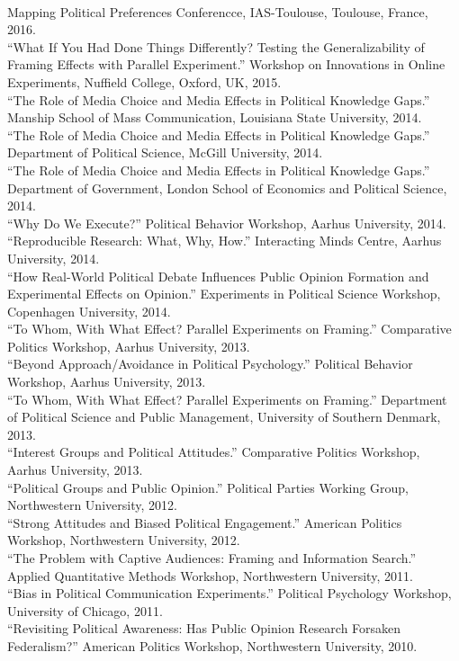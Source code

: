 \documentclass[12pt]{article}
\newcommand{\topic}[1]{\pagebreak[3]\indent {\color{lg}{\footnotesize #1 }}\\}
\newcommand{\entry}[1]{\indent {\color{lg}\guillemotright}\hspace{2pt}#1\vspace{.25em}\\}
\begin{document}
\topic{Invited Presentations}
\entry{Mapping Political Preferences Conferencce, IAS-Toulouse, Toulouse, France, 2016.}
\entry{``What If You Had Done Things Differently? Testing the Generalizability of Framing Effects with Parallel Experiment.'' Workshop on Innovations in Online Experiments, Nuffield College, Oxford, UK, 2015.}
\entry{``The Role of Media Choice and Media Effects in Political Knowledge Gaps.'' Manship School of Mass Communication, Louisiana State University, 2014.}
\entry{``The Role of Media Choice and Media Effects in Political Knowledge Gaps.'' Department of Political Science, McGill University, 2014.}
\entry{``The Role of Media Choice and Media Effects in Political Knowledge Gaps.'' Department of Government, London School of Economics and Political Science, 2014.}
\entry{``Why Do We Execute?'' Political Behavior Workshop, Aarhus University, 2014.}
\entry{``Reproducible Research: What, Why, How.'' Interacting Minds Centre, Aarhus University, 2014.}
\entry{``How Real-World Political Debate Influences Public Opinion Formation and Experimental Effects on Opinion.'' Experiments in Political Science Workshop, Copenhagen University, 2014.}
\entry{``To Whom, With What Effect? Parallel Experiments on Framing.'' Comparative Politics Workshop, Aarhus University, 2013.}
\entry{``Beyond Approach/Avoidance in Political Psychology.'' Political Behavior Workshop, Aarhus University, 2013.}
\entry{``To Whom, With What Effect? Parallel Experiments on Framing.'' Department of Political Science and Public Management, University of Southern Denmark, 2013.}
\entry{``Interest Groups and Political Attitudes.'' Comparative Politics Workshop, Aarhus University, 2013.}
\entry{``Political Groups and Public Opinion.'' Political Parties Working Group, Northwestern University, 2012.}
\entry{``Strong Attitudes and Biased Political Engagement.'' American Politics Workshop, Northwestern University, 2012.}
\entry{``The Problem with Captive Audiences: Framing and Information Search.'' Applied Quantitative Methods Workshop, Northwestern University, 2011.}
\entry{``Bias in Political Communication Experiments.'' Political Psychology Workshop, University of Chicago, 2011.}
\entry{``Revisiting Political Awareness: Has Public Opinion Research Forsaken Federalism?'' American Politics Workshop, Northwestern University, 2010.}
\end{document}
